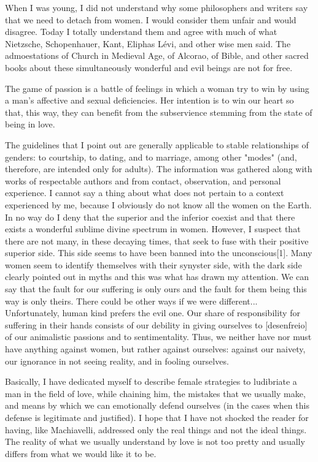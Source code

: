 When I was young, I did not understand why some philosophers and writers say that we need to detach from women.
I would consider them unfair and would disagree.
Today I totally understand them and agree with much of what Nietzsche, Schopenhauer, Kant, Eliphas Lévi, and other wise men said.
The admoestations of Church in Medieval Age, of Alcorao, of Bible, and other sacred books about these simultaneously wonderful and evil beings are not for free.

The game of passion is a battle of feelings in which a woman try to win by using a man's affective and sexual deficiencies.
Her intention is to win our heart so that, this way, they can benefit from the subservience stemming from the state of being in love.

The guidelines that I point out are generally applicable to stable relationships of genders: to courtship, to dating, and to marriage,  among other "modes" (and, therefore, are intended only for adults).
The information was gathered along with works of respectable authors and from contact, observation, and personal experience.
I cannot say a thing about what does not pertain to a context experienced by me, because I obviously do not know all the women on the Earth.
In no way do I deny that the superior and the inferior coexist and that there exists a wonderful sublime divine spectrum in women.
However, I suspect that there are not many, in these decaying times, that seek to fuse with their positive superior side.
This side seems to have been banned into the unconscious[1].
Many women seem to identify themselves with their synyster side, with the dark side clearly pointed out in myths and this was what has drawn my attention.
We can say that the fault for our suffering is only ours and the fault for them being this way is only theirs.
There could be other ways if we were different...
Unfortunately, human kind prefers the evil one.
Our share of responsibility for suffering in their hands consists of our debility in giving ourselves to [desenfreio] of our animalistic passions and to sentimentality.
Thus, we neither have nor must have anything against women, but rather against ourselves: against our naivety, our ignorance in not seeing reality, and in fooling ourselves.

Basically, I have dedicated myself to describe female strategies to ludibriate a man in the field of love, while chaining him, the mistakes that we usually make, and means by which we can emotionally defend ourselves (in the cases when this defense is legitimate and justified).
I hope that I have not shocked the reader for having, like Machiavelli, addressed only the real things and not the ideal things.
The reality of what we usually understand by love is not too pretty and usually differs from what we would like it to be.

